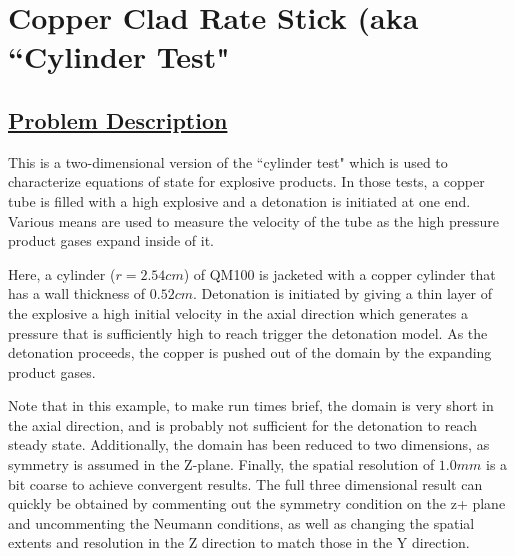 \section*{\center Copper Clad Rate Stick (aka ``Cylinder Test"}
\subsection*{\underline{Problem Description}}

This is a two-dimensional version of the ``cylinder test" which is used to
characterize equations of state for explosive products.  In those tests, a
copper tube is filled with a high explosive and a detonation is initiated
at one end.  Various means are used to measure the velocity of the tube as
the high pressure product gases expand inside of it.

Here, a cylinder ($r=2.54 cm$) of QM100 is jacketed with a copper cylinder
that has a wall thickness of $0.52 cm.$   Detonation is initiated by giving
a thin layer of the explosive a high initial velocity in the axial direction
which generates a pressure that is sufficiently high to reach trigger the
detonation model.  As the detonation proceeds, the copper is pushed out of
the domain by the expanding product gases.

Note that in this example, to make run times brief, the domain is very short
in the axial direction, and is probably not sufficient for the detonation to
reach steady state.  Additionally, the domain has been reduced to two
dimensions, as symmetry is assumed in the Z-plane.  Finally, the spatial
resolution of $1.0 mm$ is a bit coarse to achieve 
convergent results.  The full three dimensional result can quickly be
obtained by commenting out the symmetry condition on the z+ plane and
uncommenting the Neumann conditions, as well as changing the spatial extents
and resolution in the Z direction to match those in the Y direction.

%
